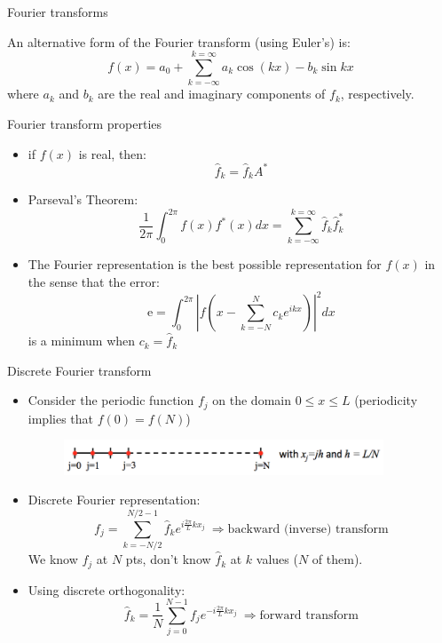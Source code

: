 \begin{frame}{Fourier transforms}

An alternative form of the Fourier transform (using Euler's) is:
$$f(x) = a_0 + \sum^{k=\infty}_{k=-\infty} a_k\cos(kx) - b_k\sin{kx}$$
where $a_k$ and $b_k$ are the real and imaginary components of $f_k$, respectively.

\end{frame}

\begin{frame}{Fourier transform properties}

\begin{itemize}
	\item if $f(x)$ is real, then: $$\hat f_k = \hat f_kA^*$$
	\item Parseval's Theorem: $$\frac{1}{2\pi} \int^{2\pi}_{0} f(x) f^*(x)dx = \sum^{k=\infty}_{k=-\infty} \hat f_k \hat f_k^*$$
	\item The Fourier representation is the best possible representation for $f(x)$ in the sense that the error:
	$$\text{e} = \int^{2\pi}_{0} \left| f\left(x - \sum^N_{k=-N} c_k e^{ikx}\right)\right|^2 dx$$
	is a minimum when $c_k = \hat f_k$
\end{itemize}

\end{frame}

\begin{frame}{Discrete Fourier transform}

\begin{itemize}
	\item Consider the periodic function $f_j$ on the domain $0\leq x \leq L$ (periodicity implies that $f(0) = f(N)$) \begin{figure}
		\includegraphics[width=0.9\textwidth]{discrete1.png}	
	\end{figure}
	\item Discrete Fourier representation:$$f_j = \sum_{k=-N/2}^{N/2-1} \hat f_k e^{i\frac{2\pi}{L}kx_j}\ \Rightarrow \text{backward (inverse) transform}$$
	We know $f_j$ at $N$ pts, don't know $\hat f_k$ at $k$ values ($N$ of them).
 	\item Using discrete orthogonality:$$\hat f_k = \frac{1}{N} \sum_{j=0}^{N-1} f_j e^{-i\frac{2\pi}{L}kx_j}\ \Rightarrow \text{forward transform}$$
 	
\end{itemize}
\end{frame}

